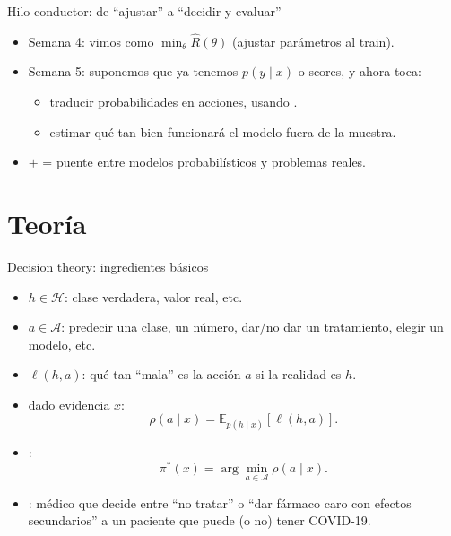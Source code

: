 \begin{frame}{Hilo conductor: de “ajustar” a “decidir y evaluar”}
\begin{itemize}
  \item Semana 4: vimos  como \(\min_\theta \hat{R}(\theta)\) (ajustar parámetros al train).
  \item Semana 5: suponemos que ya tenemos \(p(y\mid x)\) o scores, y ahora toca:
  \begin{itemize}
    \item {} traducir probabilidades en acciones, usando .
    \item {} estimar qué tan bien funcionará el modelo fuera de la muestra.
  \end{itemize}
  \item {}  \(+\)  = puente entre modelos probabilísticos y problemas reales.
\end{itemize}
\end{frame}

\section[Teoría]{Teoría\label{sec:teoria}}

\begin{frame}{Decision theory: ingredientes básicos}
\begin{itemize}
  \item {} \(h\in\mathcal{H}\): clase verdadera, valor real, etc.
  \item {} \(a\in\mathcal{A}\): predecir una clase, un número, dar/no dar un tratamiento, elegir un modelo, etc.
  \item {} \(\ell(h,a)\): qué tan “mala” es la acción \(a\) si la realidad es \(h\). \hfill {}
  \item {} dado evidencia \(x\):
  \[
    \rho(a\mid x)=\mathbb{E}_{p(h\mid x)}[\ell(h,a)].
  \]
  \item {}:
  \[
    \pi^*(x)=\arg\min_{a\in\mathcal{A}} \rho(a\mid x).
  \]
\item {}: médico que decide entre “no tratar” o “dar fármaco caro con efectos secundarios” a un paciente que puede (o no) tener COVID-19.
\end{itemize}
\end{frame}

